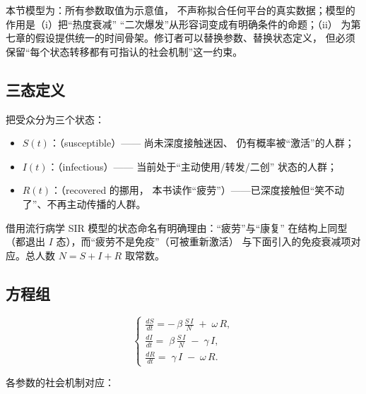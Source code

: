 \begin{nlmethod}
本节模型为：所有参数取值为示意值，
 不声称拟合任何平台的真实数据；模型的作用是（i）把“热度衰减”
“二次爆发”从形容词变成有明确条件的命题；（ii）
 为第七章的假设提供统一的时间骨架。修订者可以替换参数、替换状态定义，
 但必须保留“每个状态转移都有可指认的社会机制”这一约束。
\end{nlmethod}

\subsection{三态定义}

把受众分为三个状态：

\begin{itemize}[leftmargin=2.2em]
  \item $S(t)$：（susceptible）——
        尚未深度接触迷因、
        仍有概率被“激活”的人群；
  \item $I(t)$：（infectious）——
        当前处于“主动使用/转发/二创”
        状态的人群；
  \item $R(t)$：（recovered 的挪用，
本书读作“疲劳”）——已深度接触但“笑不动了”、不再主动传播的人群。
\end{itemize}

借用流行病学 SIR 模型的状态命名有明确理由：“疲劳”与“康复”
在结构上同型（都退出 $I$ 态），而“疲劳不是免疫”（可被重新激活）
 与下面引入的免疫衰减项对应。总人数 $N = S+I+R$ 取常数。

\subsection{方程组}

\begin{equation}\label{eq:05:sir}
\begin{cases}
\displaystyle
\frac{dS}{dt} = -\,\beta\,\frac{S\,I}{N} \;+\; \omega\, R,
\\[1.2ex]
\displaystyle
\frac{dI}{dt} = \;\beta\,\frac{S\,I}{N} \;-\; \gamma\, I,
\\[1.2ex]
\displaystyle
\frac{dR}{dt} = \;\gamma\, I \;-\; \omega\, R.
\end{cases}
\end{equation}

各参数的社会机制对应：


